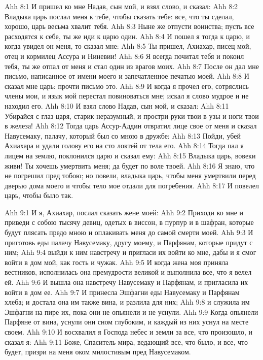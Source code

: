 \vs Ahh 8:1
И пришел ко мне Надав, сын мой, и взял слово, и сказал:
\vs Ahh 8:2
Владыка царь послал меня к тебе, чтобы сказать тебе: все, что ты сделал, хорошо, царь весьма хвалит тебя.
\vs Ahh 8:3
Ныне же отпусти воинства; пусть все расходятся к себе, ты же иди к царю один.
\vs Ahh 8:4
И пошел я тогда к царю, и когда увидел он меня, то сказал мне:
\vs Ahh 8:5
Ты пришел, Ахиахар, писец мой, отец и кормилец Ассура и Ниневии!
\vs Ahh 8:6
Я всегда почитал тебя и покоил тебя, ты же отпал от меня и стал один из врагов моих.
\vs Ahh 8:7
После он дал мне письмо, написанное от имени моего и запечатленное печатью моей.
\vs Ahh 8:8
И сказал мне царь: прочти письмо это.
\vs Ahh 8:9
И когда я прочел его, сотряслись члены мои, и язык мой перестал повиноваться мне; искал я слово мудрое и не находил его.
\vs Ahh 8:10
И взял слово Надав, сын мой, и сказал:
\vs Ahh 8:11
Убирайся с глаз царя, старик неразумный, и простри руки твои в узы и ноги твои в железа!
\vs Ahh 8:12
Тогда царь Ассур-Аддин отвратил лице свое от меня и сказал Навусемаку, палачу, который был со мною в дружбе:
\vs Ahh 8:13
Пойди, убей Ахиахара и удали голову его на сто локтей от тела его.
\vs Ahh 8:14
Тогда пал я лицем на землю, поклонился царю и сказал ему:
\vs Ahh 8:15
Владыка царь, вовеки живи! Ты хочешь умертвить меня; да будет по воле твоей.
\vs Ahh 8:16
Я знаю, что не погрешил пред тобою; но повели, владыка царь, чтобы меня умертвили перед дверью дома моего и чтобы тело мое отдали для погребения.
\vs Ahh 8:17
И повелел царь, чтобы было так.

\vs Ahh 9:1
И я, Ахиахар, послал сказать жене моей:
\vs Ahh 9:2
Приходи ко мне и приведи с собою тысячу девиц, одетых в виссон, в пурпур и в шафран, которые будут плясать предо мною и оплакивать меня до самой смерти моей.
\vs Ahh 9:3
И приготовь еды палачу Навусемаку, другу моему, и Парфянам, которые придут с ним;
\vs Ahh 9:4
выйди к ним навстречу и пригласи их войти ко мне, дабы и я смог войти в дом мой, как гость и чужак.
\vs Ahh 9:5
И когда жена моя приняла вестников, исполнилась она премудрости великой и выполнила все, что я велел ей.
\vs Ahh 9:6
И вышла она навстречу Навусемаку и Парфянам, и пригласила их войти в дом ее.
\vs Ahh 9:7
И принесла Эшфагни еды Навусемаку и Парфянам хлеба; и достала она им также вина, и разлила для них;
\vs Ahh 9:8
и служила им Эшфагни на пире их, пока они не опьянели и не уснули.
\vs Ahh 9:9
Когда опьянели Парфяне от вина, уснули они сном глубоким, и каждый из них уснул на месте своем.
\vs Ahh 9:10
И восхвалил я Господа небес и земли за все, что произошло, и сказал я:
\vs Ahh 9:11
Боже, Спаситель мира, ведающий все, что было, и все, что будет, призри на меня оком милостивым пред Навусемаком.

